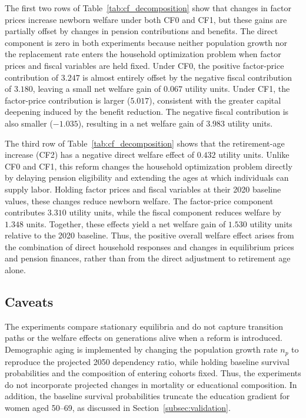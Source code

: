 \documentclass[12pt,a4paper]{article}
\begin{document}
The first two rows of Table~\ref{tab:cf_decomposition} show that changes in factor prices increase newborn welfare under both CF0 and CF1, but these gains are partially offset by changes in pension contributions and benefits. The direct component is zero in both experiments because neither population growth nor the replacement rate enters the household optimization problem when factor prices and fiscal variables are held fixed. Under CF0, the positive factor-price contribution of $3.247$ is almost entirely offset by the negative fiscal contribution of $3.180$, leaving a small net welfare gain of $0.067$ utility units. Under CF1, the factor-price contribution is larger ($5.017$), consistent with the greater capital deepening induced by the benefit reduction. The negative fiscal contribution is also smaller ($-1.035$), resulting in a net welfare gain of $3.983$ utility units.

The third row of Table~\ref{tab:cf_decomposition} shows that the retirement-age increase (CF2) has a negative direct welfare effect of $0.432$ utility units. Unlike CF0 and CF1, this reform changes the household optimization problem directly by delaying pension eligibility and extending the ages at which individuals can supply labor. Holding factor prices and fiscal variables at their 2020 baseline values, these changes reduce newborn welfare. The factor-price component contributes $3.310$ utility units, while the fiscal component reduces welfare by $1.348$ units. Together, these effects yield a net welfare gain of $1.530$ utility units relative to the 2020 baseline. Thus, the positive overall welfare effect arises from the combination of direct household responses and changes in equilibrium prices and pension finances, rather than from the direct adjustment to retirement age alone.


\subsection{Caveats}
\label{subsec:exp_caveats}

The experiments compare stationary equilibria and do not capture transition paths or the welfare effects on generations alive when a reform is introduced. Demographic aging is implemented by changing the population growth rate $n_p$ to reproduce the projected 2050 dependency ratio, while holding baseline survival probabilities and the composition of entering cohorts fixed. Thus, the experiments do not incorporate projected changes in mortality or educational composition. In addition, the baseline survival probabilities truncate the education gradient for women aged 50--69, as discussed in Section~\ref{subsec:validation}.
\end{document}
